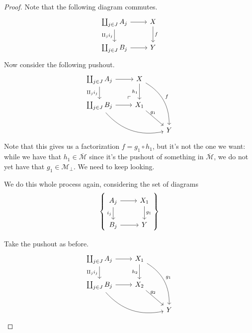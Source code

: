 \documentclass[main.tex]{subfiles}
\begin{document}
\begin{proof}
  Note that the following diagram commutes.
  \begin{equation*}
    \begin{tikzcd}
      \coprod_{j \in J} A_{j}
      \arrow[r]
      \arrow[d, swap, "\amalg_{j} i_{j}"]
      & X
      \arrow[d, "f"]
      \\
      \coprod_{j \in J} B_{j}
      \arrow[r]
      & Y
    \end{tikzcd}
  \end{equation*}
  Now consider the following pushout.
  \begin{equation*}
    \begin{tikzcd}
      \coprod_{j \in J} A_{j}
      \arrow[dr, phantom, "\ulcorner", very near end]
      \arrow[r]
      \arrow[d, swap, "\amalg_{j} i_{j}"]
      & X
      \arrow[ddr, bend left, "f"]
      \arrow[d, swap, "h_{1}"]
      \\
      \coprod_{j \in J} B_{j}
      \arrow[r]
      \arrow[rrd, bend right]
      & X_{1}
      \arrow[rd, outer sep=-2pt, near start, "g_{1}"]
      \\
      & & Y
    \end{tikzcd}
  \end{equation*}
  Note that this gives us a factorization $f = g_{1} \circ h_{1}$, but it's not the one we want: while we have that $h_{1} \in \overline{\mathcal{M}}$ since it's the pushout of something in $\overline{\mathcal{M}}$, we do not yet have that $g_{1} \in \mathcal{M}_{\perp}$. We need to keep looking.

  We do this whole process again, considering the set of diagrams
  \begin{equation*}
    \left\{
      \begin{tikzcd}
        A_{j}
        \arrow[r]
        \arrow[d, swap, "i_{j}"]
        & X_{1}
        \arrow[d, "g_{1}"]
        \\
        B_{j}
        \arrow[r]
        & Y
      \end{tikzcd}
    \right\}
  \end{equation*}

  Take the pushout as before.
  \begin{equation*}
    \begin{tikzcd}
      \coprod_{j \in J} A_{j}
      \arrow[r]
      \arrow[d, swap, "\amalg_{j} i_{j}"]
      & X_{1}
      \arrow[ddr, bend left, "g_{1}"]
      \arrow[d, swap, "h_{2}"]
      \\
      \coprod_{j \in J} B_{j}
      \arrow[r]
      \arrow[rrd, bend right]
      & X_{2}
      \arrow[rd, outer sep=-2pt, near start, "g_{2}"]
      \\
      & & Y
    \end{tikzcd}
  \end{equation*}


\end{proof}
\end{document}
